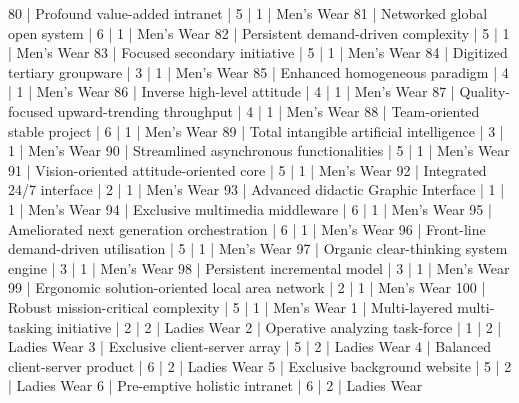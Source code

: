 \begin{enumerate}
\begin{pseudo*}
      80 | Profound value-added intranet                    |        5 |      1 | Men's Wear    
      81 | Networked global open system                     |        6 |      1 | Men's Wear    
      82 | Persistent demand-driven complexity              |        5 |      1 | Men's Wear    
      83 | Focused secondary initiative                     |        5 |      1 | Men's Wear    
      84 | Digitized tertiary groupware                     |        3 |      1 | Men's Wear    
      85 | Enhanced homogeneous paradigm                    |        4 |      1 | Men's Wear    
      86 | Inverse high-level attitude                      |        4 |      1 | Men's Wear    
      87 | Quality-focused upward-trending throughput       |        4 |      1 | Men's Wear    
      88 | Team-oriented stable project                     |        6 |      1 | Men's Wear    
      89 | Total intangible artificial intelligence         |        3 |      1 | Men's Wear    
      90 | Streamlined asynchronous functionalities         |        5 |      1 | Men's Wear    
      91 | Vision-oriented attitude-oriented core           |        5 |      1 | Men's Wear    
      92 | Integrated 24/7 interface                        |        2 |      1 | Men's Wear    
      93 | Advanced didactic Graphic Interface              |        1 |      1 | Men's Wear    
      94 | Exclusive multimedia middleware                  |        6 |      1 | Men's Wear    
      95 | Ameliorated next generation orchestration        |        6 |      1 | Men's Wear    
      96 | Front-line demand-driven utilisation             |        5 |      1 | Men's Wear    
      97 | Organic clear-thinking system engine             |        3 |      1 | Men's Wear    
      98 | Persistent incremental model                     |        3 |      1 | Men's Wear    
      99 | Ergonomic solution-oriented local area network   |        2 |      1 | Men's Wear    
     100 | Robust mission-critical complexity               |        5 |      1 | Men's Wear    
       1 | Multi-layered multi-tasking initiative           |        2 |      2 | Ladies Wear   
       2 | Operative analyzing task-force                   |        1 |      2 | Ladies Wear   
       3 | Exclusive client-server array                    |        5 |      2 | Ladies Wear   
       4 | Balanced client-server product                   |        6 |      2 | Ladies Wear   
       5 | Exclusive background website                     |        5 |      2 | Ladies Wear   
       6 | Pre-emptive holistic intranet                    |        6 |      2 | Ladies Wear   

\end{pseudo*}
\end{enumerate}
